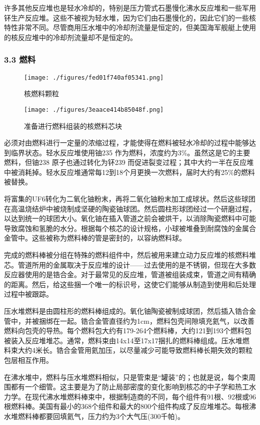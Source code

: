 许多其他反应堆也是轻水冷却的，特别是压力管式石墨慢化沸水反应堆和一些军用钚生产反应堆。这些不被视为轻水堆，因为它们由石墨慢化的，因此它们的一些核特性非常不同。尽管商用压水堆中的冷却剂流量是恒定的，但美国海军舰艇上使用的核反应堆中的冷却剂流量却不是恒定的。

\subsubsection{3.3 燃料}
\begin{figure}[ht]
\centering
\texttt{[image: ./figures/fed01f740af05341.png]}
\caption{核燃料颗粒} \label{fig_QSFYD_5}
\end{figure}

\begin{figure}[ht]
\centering
\texttt{[image: ./figures/3eaace414b85048f.png]}
\caption{准备进行燃料组装的核燃料芯块} \label{fig_QSFYD_6}
\end{figure}
必须对由燃料进行一定量的浓缩过程，才能使得在燃料被轻水冷却的过程中能够达到临界状态。轻水反应堆使用铀235 作为燃料，浓度约为3\%。虽然这是它的主要燃料，但铀238 原子也通过转化为钚239 而促进裂变过程；其中大约一半在反应堆中被消耗掉。轻水反应堆通常每12到18个月更换一次燃料，届时大约有25\%的燃料被替换。

将富集的UF6转化为二氧化铀粉末，再将二氧化铀粉末加工成球状。然后这些球团在高温烧结炉中被烧制成坚硬的陶瓷铀球团。然后圆柱形球团经过一个研磨过程，以达到统一的球团大小。氧化铀在插入管道之前会被烘干，以消除陶瓷燃料中可能导致腐蚀和氢脆的水分。根据每个核芯的设计规格，小球被堆叠到耐腐蚀的金属合金管中。这些被称为燃料棒的管是密封的，以容纳燃料球。

完成的燃料棒被分组在特殊的燃料组件中，然后被用来建立动力反应堆的核燃料堆芯。管道所用的金属取决于反应堆的设计——过去使用的是不锈钢，但现在大多数反应器使用的是锆合金。对于最常见的反应堆，管道被组装成束，管道之间有精确的距离。然后，给这些捆一个唯一的标识号，这使它们能够从制造到使用和后处理过程中被跟踪。

压水堆燃料是由圆柱形的燃料棒组成的。氧化铀陶瓷被制成球团，然后插入锆合金管中，并被捆绑在一起。锆合金管直径约为1cm，燃料包壳间隙填充氦气，以改善燃料向包壳的导热。每个燃料包大约有179-264个燃料棒，大约121到193个燃料包被装入反应堆堆芯。通常，燃料束由14x14至17x17捆扎的燃料棒组成。压水堆燃料束大约4米长。锆合金管用氦加压，以尽量减少可能导致燃料棒长期失效的颗粒包层相互作用。

在沸水堆中，燃料与压水堆燃料相似，只是管束是“罐装”的；也就是说，每个束周围都有一个细管。这主要是为了防止局部密度的变化影响到核芯的中子学和热工水力学。在现代沸水堆燃料棒束中，根据制造商的不同，每个组件有91根、92根或96根燃料棒。美国有最小的368个组件和最大的800个组件构成了反应堆堆芯。每根沸水堆燃料棒都要回填氦气，压力约为3个大气压(300千帕)。

